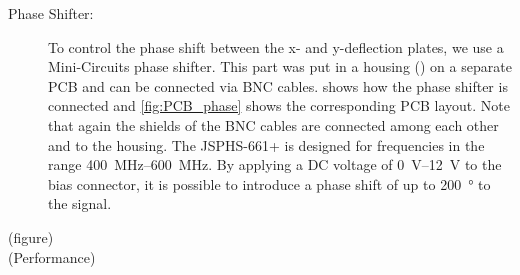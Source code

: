 \begin{description}
	\item[Phase Shifter:] To control the phase shift between the x- and y-deflection plates, we use a Mini-Circuits \cite{JSPHS-661} phase shifter. This part was put in a  housing (\cite{Hammond1455D601RD }) on a separate PCB and can be connected via BNC cables.  shows how the phase shifter is connected and \cref{fig:PCB_phase} shows the corresponding PCB layout. Note that again the shields of the BNC cables are connected among each other and to the housing. The JSPHS-661+ is designed for frequencies in the range \SIrange{400}{600}{\mega\hertz}. By applying a DC voltage of \SIrange{0}{12}{\volt} to the bias connector, it is possible to introduce a phase shift of up to \SI{200}{\degree} to the signal.
	
\end{description}

(figure)\\
(Performance)


